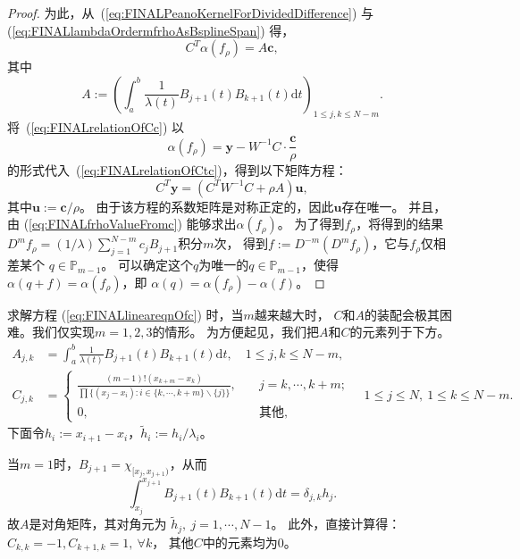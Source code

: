 \begin{proof}
为此，从~(\ref{eq:FINALPeanoKernelForDividedDifference}) 与
(\ref{eq:FINALlambdaOrdermfrhoAsBsplineSpan}) 得，
\begin{equation}
  \label{eq:FINALrelationOfCtc}
  C^{T}\alpha(f_{\rho})=A\mathbf{c},
\end{equation}
其中
\begin{displaymath}
  A:= \left( \int_{a}^{b}\frac{1}{\lambda(t)}B_{j+1}(t)B_{k+1}(t)
    \mathrm{d}t
  \right)_{1\le j,k \le N-m}.
\end{displaymath}
将~(\ref{eq:FINALrelationOfCc}) 以
\begin{equation}
  \label{eq:FINALfrhoValueFromc}
  \alpha(f_{\rho})=\mathbf{y}
  -W^{-1}C\cdot \frac{\mathbf{c}}{\rho}
\end{equation}
的形式代入~(\ref{eq:FINALrelationOfCtc})，得到以下矩阵方程：
\begin{equation}
  \label{eq:FINALlineareqnOfc}
  C^{T}\mathbf{y}=(C^{T}W^{-1}C+\rho A)\mathbf{u},
\end{equation}
其中$\mathbf{u}:=\mathbf{c}/\rho$。
由于该方程的系数矩阵是对称正定的，因此$\mathbf{u}$存在唯一。
并且，由 (\ref{eq:FINALfrhoValueFromc}) 能够求出$\alpha(f_{\rho})$。
为了得到$f_{\rho}$，将得到的结果
$D^{m}f_{\rho}=(1/\lambda)\sum_{j=1}^{N-m}c_{j}B_{j+1}$积分$m$次，
得到$f:=D^{-m}(D^{m}f_{\rho})$，它与$f_{\rho}$仅相差某个
$q\in \mathbb{P}_{m-1}$。
可以确定这个$q$为唯一的$q\in \mathbb{P}_{m-1}$，使得
$\alpha(q+f)=\alpha(f_{\rho})$，即
$\alpha(q)=\alpha(f_{\rho})-\alpha(f)$。
\end{proof}

  求解方程 (\ref{eq:FINALlineareqnOfc}) 时，当$m$越来越大时，
  $C$和$A$的装配会极其困难。我们仅实现$m=1,2,3$的情形。
  为方便起见，我们把$A$和$C$的元素列于下方。
  \begin{align*}
    A_{j,k}&= \int_{a}^{b}\frac{1}{\lambda(t)}B_{j+1}(t)B_{k+1}(t)\mathrm{d}t,\quad
             1\le j,k\le N-m,\\
    C_{j,k}&=
    \begin{cases}
      \frac{(m-1)!(x_{k+m}-x_k)}{\prod\{ (x_{j}-x_{i}):i\in\{k,\cdots,k+m\}
      \backslash\{j\} \}}, \quad &j=k,\cdots,k+m;\\
      0,\quad&\text{其他},
    \end{cases}\quad
     1\le j\le N,\ 1\le k\le N-m.
  \end{align*}
  下面令$h_{i}:=x_{i+1}-x_{i}$，$\tilde{h}_{i}:=h_{i}/\lambda_{i}$。
  
  当$m=1$时，$B_{j+1}=\chi_{[x_{j},x_{j+1})}$，从而
  \begin{displaymath}
    \int_{x_{j}}^{x_{j+1}}B_{j+1}(t)B_{k+1}(t)\mathrm{d}t=\delta_{j,k}h_{j}.
  \end{displaymath}
  故$A$是对角矩阵，其对角元为
  $\tilde{h}_{j},\ j=1,\cdots,N-1$。
  此外，直接计算得：$C_{k,k}=-1,C_{k+1,k}=1,\ \forall k$，
  其他$C$中的元素均为0。

